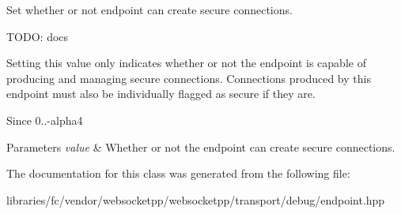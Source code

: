 Set whether or not endpoint can create secure connections. 

T\+O\+DO\+: docs

Setting this value only indicates whether or not the endpoint is capable of producing and managing secure connections. Connections produced by this endpoint must also be individually flagged as secure if they are.

\begin{DoxySince}{Since}
0..-\/alpha4
\end{DoxySince}

\begin{DoxyParams}{Parameters}
{\em value} & Whether or not the endpoint can create secure connections. \\
\hline
\end{DoxyParams}


The documentation for this class was generated from the following file\+:\begin{DoxyCompactItemize}
\item 
libraries/fc/vendor/websocketpp/websocketpp/transport/debug/endpoint.\+hpp\end{DoxyCompactItemize}
